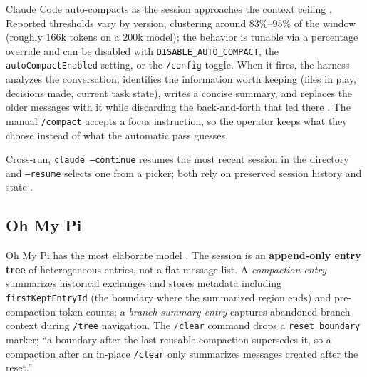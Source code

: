 \documentclass[11pt]{article}
\begin{document}
Claude Code auto-compacts as the session approaches the context ceiling
\cite{cc-context, cc-autocompact-log}. Reported thresholds vary by version,
clustering around $83\%$--$95\%$ of the window (roughly $166$k tokens on a $200$k
model); the behavior is tunable via a percentage override and can be disabled
with \texttt{DISABLE\_AUTO\_COMPACT}, the \texttt{autoCompactEnabled} setting, or
the \texttt{/config} toggle. When it fires, the harness analyzes the
conversation, identifies the information worth keeping (files in play, decisions
made, current task state), writes a concise summary, and replaces the older
messages with it while discarding the back-and-forth that led there
\cite{cc-autocompact-howto}. The manual \texttt{/compact} accepts a focus
instruction, so the operator keeps what they choose instead of what the
automatic pass guesses.

Cross-run, \texttt{claude --continue} resumes the most recent session in the
directory and \texttt{--resume} selects one from a picker; both rely on
preserved session history and state \cite{cc-autocompact-howto}.

\subsection{Oh My Pi}

Oh My Pi has the most elaborate model \cite{ohmypi-compaction, ohmypi-wiki}. The
session is an \textbf{append-only entry tree} of heterogeneous entries, not a
flat message list. A \emph{compaction entry} summarizes historical exchanges and
stores metadata including \texttt{firstKeptEntryId} (the boundary where the
summarized region ends) and pre-compaction token counts; a \emph{branch summary
entry} captures abandoned-branch context during \texttt{/tree} navigation. The
\texttt{/clear} command drops a \texttt{reset\_boundary} marker; ``a boundary
after the last reusable compaction supersedes it, so a compaction after an
in-place \texttt{/clear} only summarizes messages created after the reset.''
\end{document}
